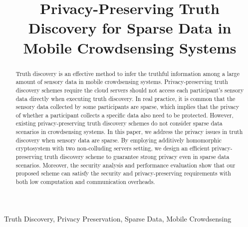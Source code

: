 \documentclass[conference]{IEEEtran}
\begin{document}
\title{Privacy-Preserving Truth Discovery for Sparse Data in Mobile Crowdsensing Systems\\
}

\author{
}
\maketitle

\begin{abstract}
Truth discovery is an effective method to infer the truthful information among a large amount of sensory data in mobile crowdsensing systems.
Privacy-preserving truth discovery schemes require the cloud servers should not access each participant's sensory data directly when executing truth discovery.
In real practice, it is common that the sensory data collected by some participants are sparse, which implies that the privacy of whether a participant collects a specific data also need to be protected.
However, existing privacy-preserving truth discovery schemes do not consider sparse data scenarios in crowdsensing systems.
In this paper, we address the privacy issues in truth discovery when sensory data are sparse.
By employing additively homomorphic cryptosystem with two non-colluding servers setting, we design an efficient privacy-preserving truth discovery scheme to guarantee strong privacy even in sparse data scenarios.
Moreover, the security analysis and performance evaluation show that our proposed scheme can satisfy the security and privacy-preserving requirements with both low computation and communication overheads.
\end{abstract}

\begin{IEEEkeywords}
Truth Discovery, Privacy Preservation, Sparse Data, Mobile Crowdsensing
\end{IEEEkeywords}
\end{document}
